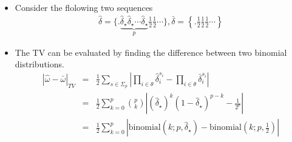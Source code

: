 \documentclass[12pt,t]{beamer}
\DeclareMathOperator{\erf}{erf} \DeclareMathOperator{\prob}{Prob}
\begin{document}
\begin{frame}
\begin{itemize}
    \item Consider the flolowing two sequences
        \begin{eqnarray} 
         \hat{\delta} 
               = \{.\underbrace{\hat{\delta}_{\star} \hat{\delta}_{\star} \cdots \hat{\delta}_{\star}}_{p}\frac{1}{2}\frac{1}{2}\cdots\},  
         \bar{\delta}= \left\{.\frac{1}{2}\frac{1}{2}\frac{1}{2}\cdots\right\}\nonumber
        \end{eqnarray}         
   \item The TV can be evaluated by finding the difference between two binomial distributions. %
        \begin{eqnarray}
           |\hat{\omega}-\bar{\omega}|_{TV}
                     & = &\frac{1}{2} \sum_{s\in\Sigma_p}
                           \left| \prod_{i\in \theta}\hat{\delta}_i^{s_i}-\prod_{i\in\theta}\bar{\delta}_i^{s_i}  \right| \nonumber \\
                     & = &\frac{1}{2}  \sum_{k=0}^p {p \choose k}
                           \left|(\hat{\delta}_\star)^k (1-\hat{\delta}_\star)^{p-k} - \frac{1}{2^p} \right| \nonumber\\
                     & = &\frac{1}{2} \sum_{k=0}^p\left|\text{binomial}(k;p,\hat{\delta}_\star)-\text{binomial}\left(k;p,\frac{1}{2}\right)\right| \nonumber
        \end{eqnarray}
\end{itemize}


\end{frame}
\end{document}
